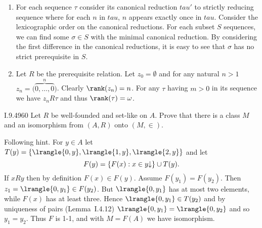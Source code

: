 \begin{enumerate}
\renewcommand{\theenumi}{\alph{enumi}}
\item
 For each sequence \(\tau\) consider its canonical reduction
 \(tau'\) to strictly reducing sequence where for each $n$ in \(tau\),
 $n$ appears exactly once in \(tau\).
 Consider the lexicographic order on the canonical reductions.
 For each subset $S$ sequences, we can find some \(\sigma\in S\) with the minimal
 canonical reduction.
 By considering the first difference in the canonical reductions,
 it is easy to see that \(\sigma\)  has no strict prerequisite in $S$.
\item
Let $R$ be the prerequisite relation.
Let \(z_0 = \emptyset\) and for any natural \(n>1\)
\(z_n = \bigl(\overbrace{0,\ldots,0}^n\bigr)\).
Clearly \(\rank(z_n) = n\).
For any \(\tau\)
having \(m>0\) in its sequence we have \(z_n R \tau\)
and thus \(\rank(\tau)=\omega\).
\end{enumerate}

\begin{lexcopy}{I.9.49}{60}
Let $R$ be well-founded and set-like on $A$. Prove that there is
a class $M$ and an isomorphism from \((A,R)\) onto \((M, \in)\).
\end{lexcopy}
Following hint. For \(y\in A\)
let \(T(y) = \{\lrangle{0,y},\lrangle{1,y},\lrangle{2,y}\}\)
and let
\begin{equation*}
F(y) = \{F(x): x\in y\kdownarrow\} \cup T(y). %
\end{equation*}
If \(xRy\) then by definition \(F(x)\in F(y)\).
Assume \(F(y_1) = F(y_2)\). Then \(z_1 = \lrangle{0,y_1} \in F(y_2)\).
But \(\lrangle{0,y_1}\) has at most two elements,
while \(F(x)\) has at least three.
Hence \(\lrangle{0,y_1} \in T(y_2)\) and by uniqueness of pairs (Lemma~I.4.12)
\(\lrangle{0,y_1} = \lrangle{0,y_2}\) and so \(y_1 = y_2\).
Thus $F$ is 1-1, and with \(M=F(A)\) we have isomorphism.

